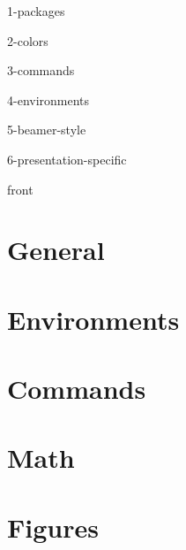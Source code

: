 \def\shareable{1}
\newcommand{\configpath}{../.config/}
\newcommand{\specificpath}{../.config/}

\usepackage{import}

{1-packages}

{2-colors}

{3-commands}

{4-environments}

{5-beamer-style}

{6-presentation-specific}

{front} %

\section{General}


\section{Environments}


\section{Commands}


\section{Math}


\section{Figures}


% 

